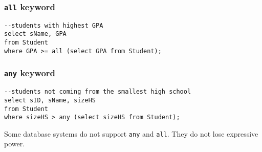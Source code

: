 \subsubsection{\texttt{all} keyword}
\begin{lstlisting}
--students with highest GPA
select sName, GPA
from Student
where GPA >= all (select GPA from Student);
\end{lstlisting}
\subsubsection{\texttt{any} keyword}
\begin{lstlisting}
--students not coming from the smallest high school
select sID, sName, sizeHS
from Student
where sizeHS > any (select sizeHS from Student);
\end{lstlisting}
Some database systems do not support \texttt{any} and \texttt{all}. They do not lose expressive power.
\ifx\PREAMBLE\undefined

\fi